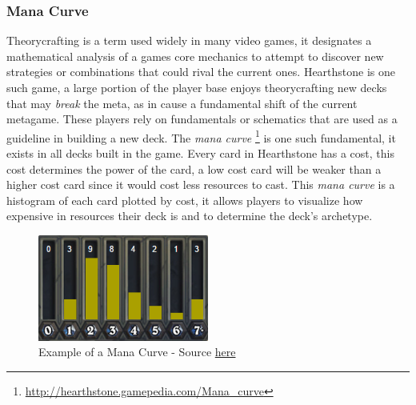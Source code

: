 \documentclass{report}
\begin{document}
\subsubsection{Mana Curve}
	Theorycrafting is a term used widely in many video games, it designates a mathematical analysis of a games core mechanics to attempt to discover new strategies or combinations that could rival the current ones. Hearthstone is one such game, a large portion of the player base enjoys theorycrafting new decks that may {\it{break}} the meta, as in cause a fundamental shift of the current metagame. These players rely on fundamentals or schematics that are used as a guideline in building a new deck. The {\it{mana curve}} \footnote{\url{http://hearthstone.gamepedia.com/Mana_curve}} is one such fundamental, it exists in all decks built in the game. Every card in Hearthstone has a cost, this cost determines the power of the card, a low cost card will be weaker than a higher cost card since it would cost less resources to cast. This {\it{mana curve}} is a histogram of each card plotted by cost, it allows players to visualize how expensive in resources their deck is and to determine the deck's archetype. 
\begin{figure}[h]
\centering
\includegraphics[width=0.5\textwidth]{mana_curve}
\caption{Example of a Mana Curve  - Source
 \href{https://hearthstone.judgehype.com/deck-mage-tempo-ladder-legendaire-tgt-gvg/}{here}  }
\label{board}
\end{figure}
\end{document}
